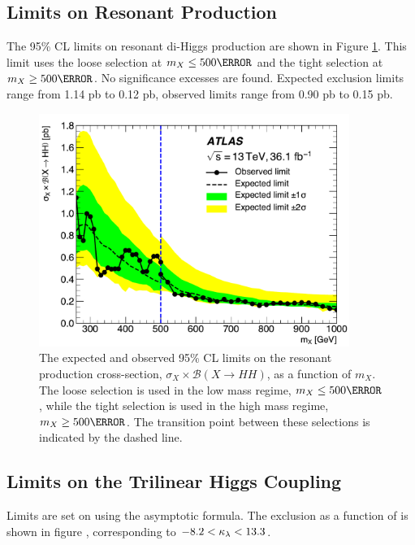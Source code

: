 \subsection{Limits on Resonant Production}

The 95\% \gls{CL} limits on resonant di-Higgs production are shown in Figure \ref{fig:limits-resonant}. This limit uses the loose selection at $m_{X} \leq \unit{500}{\GeV}$ and the tight selection at $m_{X} \geq \unit{500}{\GeV}$. No significance excesses are found. Expected exclusion limits range from 1.14 pb to 0.12 pb, observed limits range from 0.90 pb to 0.15 pb.

\begin{figure}[htbp]
  \centering
\includegraphics[width=0.9\textwidth]{chapters/chapter5_yybb/images/limits/resonant.pdf}
\caption[The expected and observed limits on the resonant \HH production cross section as a function of $m_{X}$.]
{The expected and observed 95\% \gls{CL} limits on the resonant \HH production cross-section, $\sigma_{X} \times \mathcal{B}(X\rightarrow HH)$, as a function of $m_{X}$. The loose selection is used in the low mass regime, $m_{X} \leq \unit{500}{\GeV}$, while the tight selection is used in the high mass regime, $m_{X} \geq \unit{500}{\GeV}$. The transition point between these selections is indicated by the dashed line.} 
\label{fig:limits-resonant}
\end{figure}

\subsection{Limits on the Trilinear Higgs Coupling}

Limits are set on \klambda using the asymptotic formula. The exclusion as a function of \klambda is shown in figure , corresponding to $-8.2 < \kappa_{\lambda} < 13.3$.

